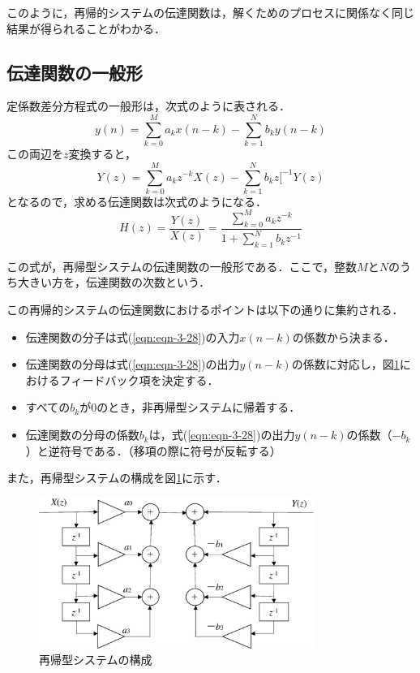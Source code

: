このように，再帰的システムの伝達関数は，解くためのプロセスに関係なく同じ結果が得られることがわかる．


\subsection{伝達関数の一般形}

定係数差分方程式の一般形は，次式のように表される．
\begin{equation}
y(n)=\sum_{k=0}^{M}a_kx(n-k)-\sum_{k=1}^{N}b_ky(n-k)
\end{equation}
この両辺を$z$変換すると，
\begin{equation}
Y(z)=\sum_{k=0}^{M}a_kz^{-k}X(z)-\sum_{k=1}^{N}b_kz[^{-1}Y(z)
\end{equation}
となるので，求める伝達関数は次式のようになる．
\begin{equation}
H(z)=\frac{Y(z)}{X(z)}=\frac{\displaystyle \sum_{k=0}^{M}a_kz^{-k}}{1+ \displaystyle \sum_{k=1}^{N}b_kz{^{-1}}} \label{eqn:eqn-3-28}
\end{equation}

この式が，再帰型システムの伝達関数の一般形である．ここで，整数$M$と$N$のうち大きい方を，伝達関数の次数という．

この再帰的システムの伝達関数におけるポイントは以下の通りに集約される．
\begin{itemize}
\item 伝達関数の分子は式(\ref{eqn:eqn-3-28})の入力$x(n-k)$の係数から決まる．
\item 伝達関数の分母は式(\ref{eqn:eqn-3-28})の出力$y(n-k)$の係数に対応し，図\ref{fig:figure-5-2}におけるフィードバック項を決定する．
\item すべての$b_k$が0のとき，非再帰型システムに帰着する．
\item 伝達関数の分母の係数$b_k$は，式(\ref{eqn:eqn-3-28})の出力$y(n-k)$の係数（$-b_k$）と逆符号である．（移項の際に符号が反転する）
\end{itemize}

また，再帰型システムの構成を図\ref{fig:figure-5-2}に示す．

\begin{figure}[H]
\begin{center}
\includegraphics[width=9cm]{fig/figure-5-2.eps}
\end{center}
\caption{再帰型システムの構成}
\label{fig:figure-5-2}
\end{figure}

